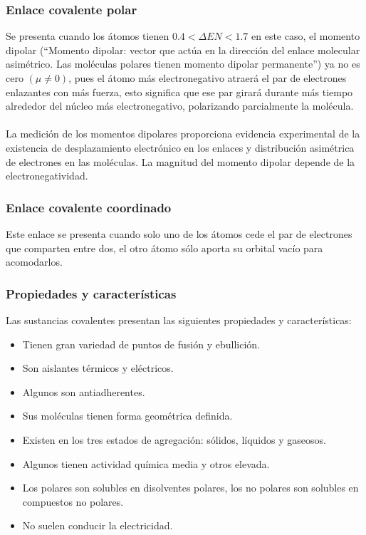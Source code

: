 \documentclass[12pt]{article}
\begin{document}
                    \subsubsection{Enlace covalente polar}\label{sec:Enlace covalente polar}
                         Se presenta cuando los átomos tienen $0.4 < \Delta EN < 1.7$ en este caso, el momento dipolar (“Momento dipolar: vector que actúa en la dirección del enlace molecular asimétrico. Las moléculas polares tienen momento dipolar permanente”) ya no es cero $(\mu \neq 0)$, pues el átomo más electronegativo atraerá el par de electrones enlazantes con más fuerza, esto significa que ese par girará durante más tiempo alrededor del núcleo más electronegativo, polarizando parcialmente la molécula.\\\\
                         La medición de los momentos dipolares proporciona evidencia experimental de la existencia de desplazamiento electrónico en los enlaces y distribución asimétrica de electrones en las moléculas. La magnitud del momento dipolar depende de la electronegatividad.
                    
                    \subsubsection{Enlace covalente coordinado}\label{sec:Enlace covalente coordinado}
                         Este enlace se presenta cuando solo uno de los átomos cede el par de electrones que comparten entre dos, el otro átomo sólo aporta su orbital vacío para acomodarlos.
                    
                    \subsubsection{Propiedades y características}\label{sec:Propiedades y características}
                         Las sustancias covalentes presentan las siguientes propiedades y características:

                         \begin{itemize}
                              \item Tienen gran variedad de puntos de fusión y ebullición.
                              \item Son aislantes térmicos y eléctricos.
                              \item Algunos son antiadherentes.
                              \item Sus moléculas tienen forma geométrica definida.
                              \item Existen en los tres estados de agregación: sólidos, líquidos y gaseosos.
                              \item Algunos tienen actividad química media y otros elevada.
                              \item Los polares son solubles en disolventes polares, los no polares son solubles en compuestos no polares.
                              \item No suelen conducir la electricidad.
                         \end{itemize}
     
     \nocite{*}
         
     
\end{document}
